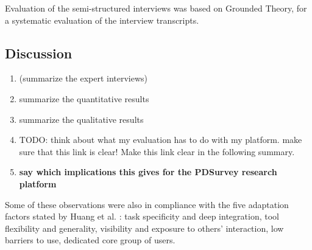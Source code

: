 

	Evaluation of the semi-structured interviews was based on Grounded Theory, for a systematic evaluation of the interview transcripts.










\subsection{Discussion}


	\begin{enumerate}
	\item (summarize the expert interviews)
	\item summarize the quantitative results
	\item summarize the qualitative results 
	\item TODO: think about what my evaluation has to do with my platform. make sure that this link is clear! Make this link clear in the following summary.
	\item \textbf{say which implications this gives for the PDSurvey research platform}
	\end{enumerate}


	Some of these observations were also in compliance with the five adaptation factors stated by Huang et al. \cite{Huang2004}: task specificity and deep integration, tool flexibility and generality, visibility and exposure to others' interaction, low barriers to use, dedicated core group of users.

